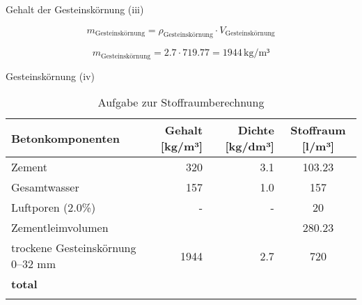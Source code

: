 \begin{frame}{Gehalt der Gesteinskörnung (iii)}

    \begin{equation*}
        m_{\text{Gesteinskörnung}} = \rho_{\text{Gesteinskörnung}} \cdot V_{\text{Gesteinskörnung}}
    \end{equation*}

    \pause
    \vspace{1cm}
    \begin{equation*}
        m_{\text{Gesteinskörnung}} = 2.7 \cdot 719.77 = 1944 \, \text{kg/m³}
    \end{equation*}

\end{frame}


\begin{frame}{Gesteinskörnung (iv)}
    \begin{table}[h]
        \centering
        \caption{Aufgabe zur Stoffraumberechnung}
        \small
        \begin{tabular}{lrrc}
        \toprule
        \textbf{Betonkomponenten}       & \textbf{Gehalt [kg/m³]} & \textbf{Dichte [kg/dm³]} & \textbf{Stoffraum [l/m³]} \\ 
        \midrule
        Zement                           & 320                      & 3.1                       &    103.23          \\
        Gesamtwasser                     & 157                      & 1.0                       &  157            \\
        Luftporen (2.0\%)                & -                        & -                         & 20              \\
        Zementleimvolumen                &                          &                           & 280.23                          \\
        trockene Gesteinskörnung 0–32 mm & 1944                     & 2.7                       & 720              \\
        \textbf{total}                   & {}        &                           & {}             \\
        \bottomrule
        \label{tab:Stoffraumberechnung}
        \end{tabular}
        \end{table}

\end{frame}
